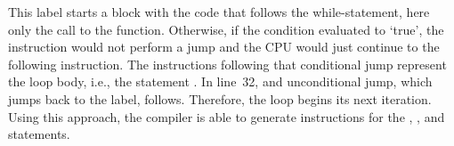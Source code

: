 This label starts a block with the code that follows the while-statement, here only the call to the  function.
Otherwise, if the condition evaluated to `true', the  instruction would not perform a jump and the CPU would just continue to the following instruction.
The instructions following that conditional jump represent the loop body, i.e., the statement .
In line~32, and unconditional jump, which jumps back to the  label, follows.
Therefore, the loop begins its next iteration.
Using this approach, the compiler is able to generate instructions for the , , and  statements.
